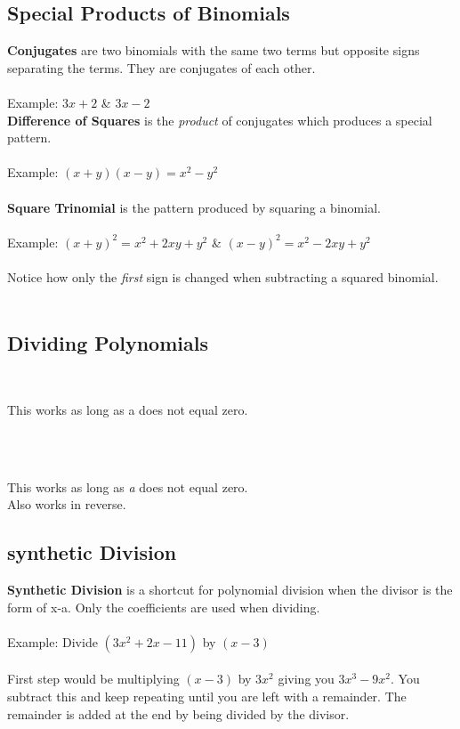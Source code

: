 \subsection{Special Products of Binomials}
\textbf{Conjugates} are two binomials with the same two terms but opposite signs separating the terms. They are conjugates of each other.\\
\\Example: $3x + 2$ \& $3x - 2$\\

\textbf{Difference of Squares} is the \textit{product} of conjugates which produces a special pattern.\\
\\Example: $(x + y)(x - y) = x^2 - y^2$\\
\\
\textbf{Square Trinomial} is the pattern produced by squaring a binomial.\\
\\Example: $(x + y)^2 = x^2 + 2xy + y^2$ \& $(x - y)^2 = x^2 - 2xy + y^2$\\
\\
Notice how only the \textit{first} sign is changed when subtracting a squared binomial.
\\ \\

\subsection{Dividing Polynomials}
\begin{center}
	 \\
\end{center}
This works as long as a does not equal zero.\\
\\
\begin{center}
	 \\
\end{center}
This works as long as \textit{a} does not equal zero.\\ Also works in reverse.
\\

\subsection{synthetic Division}
\textbf{Synthetic Division} is a shortcut for polynomial division when the divisor is the form of x-a. Only the coefficients are used when dividing.\\
\\
Example: Divide $(3x^2 + 2x - 11)$ by $(x-3)$\\
\\
First step would be multiplying $(x-3)$ by $3x^2$ giving you $3x^3 - 9x^2$. You subtract this and keep repeating until you are left with a remainder. The remainder is added at the end by being divided by the divisor.

